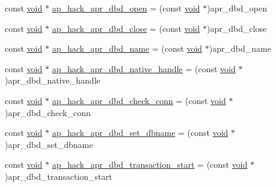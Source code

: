\begin{DoxyCompactItemize}
\item 
const \hyperlink{group__MOD__ISAPI_gacd6cdbf73df3d9eed42fa493d9b621a6}{void} $\ast$ \hyperlink{srclib_2apr-util_2exports_8c_a015751217ceb77c462dc443f7fdacf6a}{ap\+\_\+hack\+\_\+apr\+\_\+dbd\+\_\+open} = (const \hyperlink{group__MOD__ISAPI_gacd6cdbf73df3d9eed42fa493d9b621a6}{void} $\ast$)apr\+\_\+dbd\+\_\+open
\item 
const \hyperlink{group__MOD__ISAPI_gacd6cdbf73df3d9eed42fa493d9b621a6}{void} $\ast$ \hyperlink{srclib_2apr-util_2exports_8c_aa5d194f25c8077b47afa09b69f18bf1b}{ap\+\_\+hack\+\_\+apr\+\_\+dbd\+\_\+close} = (const \hyperlink{group__MOD__ISAPI_gacd6cdbf73df3d9eed42fa493d9b621a6}{void} $\ast$)apr\+\_\+dbd\+\_\+close
\item 
const \hyperlink{group__MOD__ISAPI_gacd6cdbf73df3d9eed42fa493d9b621a6}{void} $\ast$ \hyperlink{srclib_2apr-util_2exports_8c_af7ce20157ed366968d8068c136c0a18f}{ap\+\_\+hack\+\_\+apr\+\_\+dbd\+\_\+name} = (const \hyperlink{group__MOD__ISAPI_gacd6cdbf73df3d9eed42fa493d9b621a6}{void} $\ast$)apr\+\_\+dbd\+\_\+name
\item 
const \hyperlink{group__MOD__ISAPI_gacd6cdbf73df3d9eed42fa493d9b621a6}{void} $\ast$ \hyperlink{srclib_2apr-util_2exports_8c_abea6e5e0b4ba7e5187fa2ae9a4c0cdda}{ap\+\_\+hack\+\_\+apr\+\_\+dbd\+\_\+native\+\_\+handle} = (const \hyperlink{group__MOD__ISAPI_gacd6cdbf73df3d9eed42fa493d9b621a6}{void} $\ast$)apr\+\_\+dbd\+\_\+native\+\_\+handle
\item 
const \hyperlink{group__MOD__ISAPI_gacd6cdbf73df3d9eed42fa493d9b621a6}{void} $\ast$ \hyperlink{srclib_2apr-util_2exports_8c_a07251df7aa7d6cf0922ce7103194e3f1}{ap\+\_\+hack\+\_\+apr\+\_\+dbd\+\_\+check\+\_\+conn} = (const \hyperlink{group__MOD__ISAPI_gacd6cdbf73df3d9eed42fa493d9b621a6}{void} $\ast$)apr\+\_\+dbd\+\_\+check\+\_\+conn
\item 
const \hyperlink{group__MOD__ISAPI_gacd6cdbf73df3d9eed42fa493d9b621a6}{void} $\ast$ \hyperlink{srclib_2apr-util_2exports_8c_af3c547a16dc6b44f5f5ca238ff6076c4}{ap\+\_\+hack\+\_\+apr\+\_\+dbd\+\_\+set\+\_\+dbname} = (const \hyperlink{group__MOD__ISAPI_gacd6cdbf73df3d9eed42fa493d9b621a6}{void} $\ast$)apr\+\_\+dbd\+\_\+set\+\_\+dbname
\item 
const \hyperlink{group__MOD__ISAPI_gacd6cdbf73df3d9eed42fa493d9b621a6}{void} $\ast$ \hyperlink{srclib_2apr-util_2exports_8c_a6db66e1d37d56d5f7129a96a78c88026}{ap\+\_\+hack\+\_\+apr\+\_\+dbd\+\_\+transaction\+\_\+start} = (const \hyperlink{group__MOD__ISAPI_gacd6cdbf73df3d9eed42fa493d9b621a6}{void} $\ast$)apr\+\_\+dbd\+\_\+transaction\+\_\+start

\end{DoxyCompactItemize}
